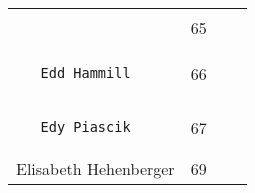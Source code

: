 \documentclass[]{article}
\begin{document}
\begin{longtable}[c]{@{}llll@{}}
\begin{minipage}[t]{0.39\columnwidth}
\begin{verbatim}
\end{verbatim}
\end{minipage} & \begin{minipage}[t]{0.10\columnwidth}\raggedright
65
\end{minipage} & \begin{minipage}[t]{0.13\columnwidth}\raggedright
\end{minipage} & \begin{minipage}[t]{0.15\columnwidth}\raggedright
\end{minipage}
\\\noalign{\medskip}
\begin{minipage}[t]{0.39\columnwidth}\raggedright
\begin{verbatim}
   Edd Hammill
\end{verbatim}
\end{minipage} & \begin{minipage}[t]{0.10\columnwidth}\raggedright
66
\end{minipage} & \begin{minipage}[t]{0.13\columnwidth}\raggedright
\end{minipage} & \begin{minipage}[t]{0.15\columnwidth}\raggedright
\end{minipage}
\\\noalign{\medskip}
\begin{minipage}[t]{0.39\columnwidth}\raggedright
\begin{verbatim}
   Edy Piascik
\end{verbatim}
\end{minipage} & \begin{minipage}[t]{0.10\columnwidth}\raggedright
67
\end{minipage} & \begin{minipage}[t]{0.13\columnwidth}\raggedright
\end{minipage} & \begin{minipage}[t]{0.15\columnwidth}\raggedright
\end{minipage}
\\\noalign{\medskip}
\begin{minipage}[t]{0.39\columnwidth}\raggedright
Elisabeth Hehenberger
\end{minipage} & \begin{minipage}[t]{0.10\columnwidth}\raggedright
69
\end{minipage} & \begin{minipage}[t]{0.13\columnwidth}\raggedright
\end{minipage} & \begin{minipage}[t]{0.15\columnwidth}\raggedright

\end{minipage}
\end{longtable}
\end{document}

